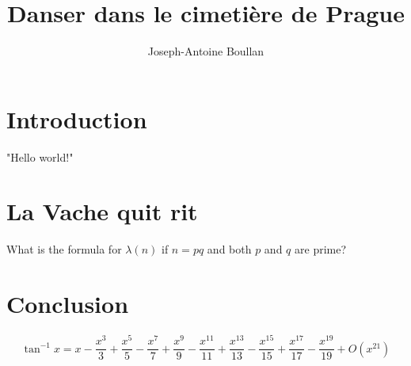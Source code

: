 \documentclass{article}
\title{Danser dans le cimeti\`ere de Prague}
\author{Joseph-Antoine Boullan}
\begin{document}
\maketitle

\section{Introduction}

"Hello world!"

\section{La Vache quit rit}

What is the formula for $\lambda(n)$ if $n = p q$ and both $p$ and $q$ are prime?

\section{Conclusion}
$$
\tan^{-1} x =
x-\frac{x^3}{3}+\frac{x^5}{5}-\frac{x^7}{7}+\frac{x^9}{9}-\frac{x^{11}}{11}+\frac{x^{13}}
   {13}-\frac{x^{15}}{15}+\frac{x^{17}}{17}-\frac{x^{19}}{19}+O\left(x^{21}\right)
$$
\end{document}
